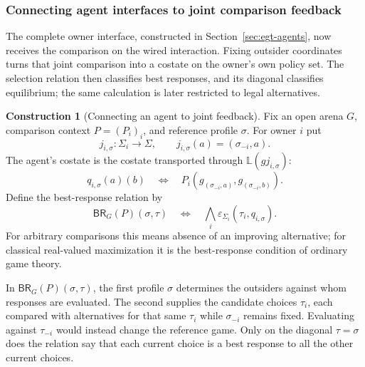 \documentclass[11pt,a4paper]{article}
\numberwithin{equation}{section}
\theoremstyle{definition}
\newtheorem{construction}[construction]{Construction}
\theoremstyle{remark}
\theoremstyle{plain}
\begin{document}
\subsubsection{Connecting agent interfaces to joint comparison feedback}

The complete owner interface, constructed in
Section~\ref{sec:egt-agents}, now receives the comparison on the wired
interaction. Fixing outsider coordinates turns that joint comparison into
a costate on the owner's own policy set. The selection relation then
classifies best responses, and its diagonal classifies equilibrium; the
same calculation is later restricted to legal alternatives.

\begin{construction}[Connecting an agent to joint feedback]
\label{con:cgt-player-feedback}
Fix an open arena $G$, comparison context $P=(P_i)_i$, and reference
profile $\sigma$. For owner $i$ put
\[
 j_{i,\sigma}:\Sigma_i\to\Sigma,
 \qquad j_{i,\sigma}(a)=(\sigma_{-i},a).
\]
The agent's costate is the costate transported through
$\mathbb L(gj_{i,\sigma})$:
\begin{equation}\label{eq:cgt-player-costate}
 q_{i,\sigma}(a)(b)
 \quad\Longleftrightarrow\quad
 P_i(g_{(\sigma_{-i},a)},g_{(\sigma_{-i},b)}).
\end{equation}
Define the best-response relation by
\[
 \mathsf{BR}_G(P)(\sigma,\tau)
 \quad\Longleftrightarrow\quad
 \bigwedge_i\varepsilon_{\Sigma_i}(\tau_i,q_{i,\sigma}).
\]
For arbitrary comparisons this means absence of an improving alternative;
for classical real-valued maximization it is the best-response condition of ordinary game theory.
\end{construction}

In $\mathsf{BR}_G(P)(\sigma,\tau)$, the first profile $\sigma$ determines the
outsiders against whom responses are evaluated. The second supplies the
candidate choices $\tau_i$, each compared with alternatives for that
same $\tau_i$ while
$\sigma_{-i}$ remains fixed. Evaluating against $\tau_{-i}$ would instead
change the reference game. Only on the diagonal $\tau=\sigma$ does the
relation say that each current choice is a best response to all the other
current choices.
\end{document}
